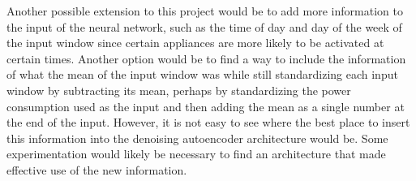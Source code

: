 \documentclass{article}
\begin{document}
Another possible extension to this project would be to add more information to the input of the neural network, such as the time of day and day of the week of the input window since certain appliances are more likely to be activated at certain times. Another option would be to find a way to include the information of what the mean of the input window was while still standardizing each input window by subtracting its mean\cite{Kelly}, perhaps by standardizing the power consumption used as the input and then adding the mean as a single number at the end of the input. However, it is not easy to see where the best place to insert this information into the denoising autoencoder architecture would be. Some experimentation would likely be necessary to find an architecture that made effective use of the new information.




\end{document}
